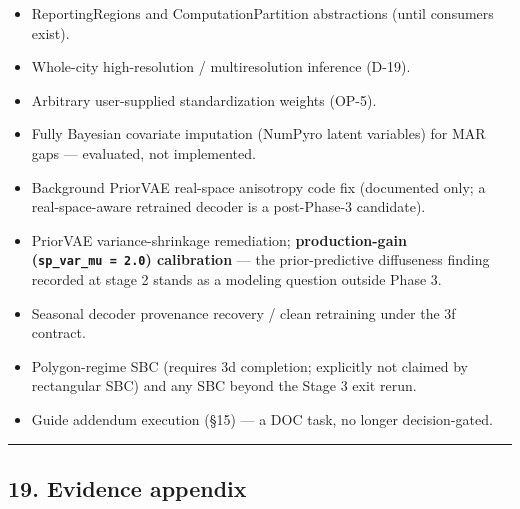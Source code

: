 \documentclass[
  10pt,
]{article}
\providecommand{\tightlist}{%
  \setlength{\itemsep}{0pt}\setlength{\parskip}{0pt}}
\begin{document}
\begin{itemize}
\tightlist
\item
  ReportingRegions and ComputationPartition abstractions (until consumers exist).
\item
  Whole-city high-resolution / multiresolution inference (D-19).
\item
  Arbitrary user-supplied standardization weights (OP-5).
\item
  Fully Bayesian covariate imputation (NumPyro latent variables) for MAR gaps --- evaluated, not implemented.
\item
  Background PriorVAE real-space anisotropy code fix (documented only; a real-space-aware retrained decoder is a post-Phase-3 candidate).
\item
  PriorVAE variance-shrinkage remediation; \textbf{production-gain (\texttt{sp\_var\_mu\ =\ 2.0}) calibration} --- the prior-predictive diffuseness finding recorded at stage 2 stands as a modeling question outside Phase 3.
\item
  Seasonal decoder provenance recovery / clean retraining under the 3f contract.
\item
  Polygon-regime SBC (requires 3d completion; explicitly not claimed by rectangular SBC) and any SBC beyond the Stage 3 exit rerun.
\item
  Guide addendum execution (§15) --- a DOC task, no longer decision-gated.
\end{itemize}

\begin{center}\rule{0.5\linewidth}{0.5pt}\end{center}

\hypertarget{evidence-appendix}{%
\subsection{19. Evidence appendix}\label{evidence-appendix}}
\end{document}
